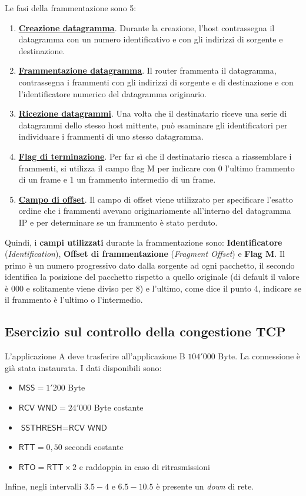 \documentclass[a4paper]{article}
\begin{document}
	Le fasi della frammentazione sono 5:
	\begin{enumerate}[label=\Roman*.]
		\item \textbf{\underline{Creazione datagramma}}. Durante la creazione, l’host contrassegna il datagramma con un numero identificativo e con gli indirizzi di sorgente e destinazione.
		
		\item \textbf{\underline{Frammentazione datagramma}}. Il router frammenta il datagramma, contrassegna i frammenti con gli indirizzi di sorgente e di destinazione e con l’identificatore numerico del datagramma originario.
		
		\item \textbf{\underline{Ricezione datagrammi}}. Una volta che il destinatario riceve una serie di datagrammi dello stesso host mittente, può esaminare gli identificatori per individuare i frammenti di uno stesso datagramma.
		
		\item \textbf{\underline{Flag di terminazione}}. Per far sì che il destinatario riesca a riassemblare i frammenti, si utilizza il campo flag \textsf{M} per indicare con 0 l’ultimo frammento di un frame e 1 un frammento intermedio di un frame.
		
		\item \textbf{\underline{Campo di offset}}. Il campo di offset viene utilizzato per specificare l’esatto ordine che i frammenti avevano originariamente all’interno del datagramma IP e per determinare se un frammento è stato perduto.
	\end{enumerate}
	Quindi, i \textbf{campi utilizzati} durante la frammentazione sono: \textbf{Identificatore} (\emph{Identification}), \textbf{Offset di frammentazione} (\emph{Fragment Offset}) e \textbf{Flag M}. Il primo è un numero progressivo dato dalla sorgente ad ogni pacchetto, il secondo identifica la posizione del pacchetto rispetto a quello originale (di default il valore è $000$ e solitamente viene diviso per $8$) e l'ultimo, come dice il punto 4, indicare se il frammento è l'ultimo o l'intermedio.
	\newpage

	\subsection{\textcolor{Red3}{Esercizio sul controllo della congestione TCP}}
	
	L’applicazione A deve trasferire all'applicazione B $104'000$ Byte. La connessione è già stata instaurata. I dati disponibili sono:
	\begin{itemize}
		\item $\textsf{MSS} = 1'200$ Byte
		\item $\textsf{RCV WND} = 24'000$ Byte costante
		\item $\textsf{SSTHRESH} = \textsf{RCV WND}$
		\item $\textsf{RTT} = 0,50$ secondi costante
		\item $\textsf{RTO} = \textsf{RTT} \times 2$ e raddoppia in caso di ritrasmissioni
	\end{itemize}
	Infine, negli intervalli $3.5 - 4$ e $6.5 - 10.5$ è presente un \emph{down} di rete.\newline
	
\end{document}
